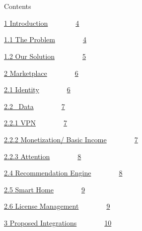 \documentclass[]{article}
\begin{document}
{}

{}

{~~~~~~~~}

{}

{~~~~~~~~}

{}

{}

{}

{}

{}

{}

{}

{}

{}

{}

{}

{Contents}

{}

{\protect\hyperlink{h.k8evwgrqtimr}{1
Introduction}}{~~~~~~~~}{\protect\hyperlink{h.k8evwgrqtimr}{4}}

{\protect\hyperlink{h.ptf3ammqc60}{1.1 The
Problem}}{~~~~~~~~}{\protect\hyperlink{h.ptf3ammqc60}{4}}

{\protect\hyperlink{h.edvz3heatl5d}{1.2 Our
Solution}}{~~~~~~~~}{\protect\hyperlink{h.edvz3heatl5d}{5}}

{\protect\hyperlink{h.vwzlhmcm9xyr}{2
Marketplace}}{~~~~~~~~}{\protect\hyperlink{h.vwzlhmcm9xyr}{6}}

{\protect\hyperlink{h.ukaigmyfvdlo}{2.1
Identity}}{~~~~~~~~}{\protect\hyperlink{h.ukaigmyfvdlo}{6}}

{\protect\hyperlink{h.kgi69li2zlx8}{2.2
~Data}}{~~~~~~~~}{\protect\hyperlink{h.kgi69li2zlx8}{7}}

{\protect\hyperlink{h.tlnerex8fnuq}{2.2.1
VPN}}{~~~~~~~~}{\protect\hyperlink{h.tlnerex8fnuq}{7}}

{\protect\hyperlink{h.wqrovzr5bezd}{2.2.2 Monetization/ Basic
Income}}{~~~~~~~~}{\protect\hyperlink{h.wqrovzr5bezd}{7}}

{\protect\hyperlink{h.nds6n37tv79g}{2.2.3
Attention}}{~~~~~~~~}{\protect\hyperlink{h.nds6n37tv79g}{8}}

{\protect\hyperlink{h.ap0uyehaseve}{2.4 Recommendation
Engine}}{~~~~~~~~}{\protect\hyperlink{h.ap0uyehaseve}{8}}

{\protect\hyperlink{h.yijfdpnvz4k0}{2.5 Smart
Home}}{~~~~~~~~}{\protect\hyperlink{h.yijfdpnvz4k0}{9}}

{\protect\hyperlink{h.8faks1k6o2ft}{2.6 License
Management}}{~~~~~~~~}{\protect\hyperlink{h.8faks1k6o2ft}{9}}

{\protect\hyperlink{h.es6ndspslxqp}{3 Proposed
Integrations}}{~~~~~~~~}{\protect\hyperlink{h.es6ndspslxqp}{10}}
\end{document}
